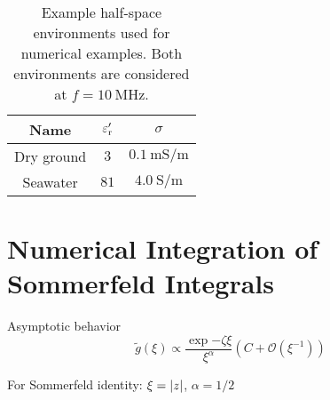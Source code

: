\begin{table}[hbt]
	\centering
	\begin{tabular}{ccc}
		\toprule%
		Name & $\varepsilon_{\mathrm{r}}^\prime$ & $\sigma$ \\
		\midrule
		Dry ground & $\num{3}$  & $\SI{0.1}{\milli\siemens\per\metre}$ \\
		Seawater   & $\num{81}$ & $\SI{4.0}{\siemens\per\metre}$ \\
		\bottomrule
	\end{tabular}

	\caption[Example half-space environments]
	{Example half-space environments used for numerical examples.
    Both environments are considered at $f = \SI{10}{\mega\hertz}$.}
	\label{tab:numerical_examples_half_spaces}
\end{table}


\section{Numerical Integration of Sommerfeld Integrals}

\cite{Michalski2016a}

Asymptotic behavior \cite{Michalski1998}
\begin{equation}
    \tilde{g}\left(\xi\right)
    \propto \frac{\exp{-\zeta \xi}}{\xi^\alpha}
    \left(C + \mathcal{O}\left(\xi^{-1}\right)\right)
\end{equation}

For Sommerfeld identity: $\xi = \left\vert z\right\vert$, $\alpha = 1/2$

